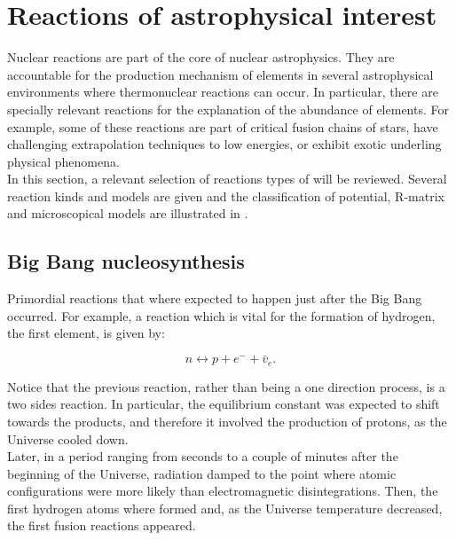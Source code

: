 \documentclass[openany]{book}
\begin{document}
\chapter{Reactions of astrophysical interest}  \label{ch:reactionsInterest}

Nuclear reactions are part of the core of nuclear astrophysics. They are accountable for the production mechanism of elements in several astrophysical environments where thermonuclear reactions can occur. In particular, there are specially relevant reactions for the explanation of the abundance of elements. For example, some of these reactions are part of critical fusion chains of stars, have challenging extrapolation techniques to low energies, or  exhibit exotic underling physical phenomena.   \\

In this section, a relevant selection of reactions types of will be reviewed.  Several reaction kinds and models are given and the classification of potential, R-matrix and microscopical models are illustrated in \cite{descouvemont_2020}.



\section{Big Bang nucleosynthesis} \label{sec:BBN}

Primordial reactions that where expected to happen just after the Big Bang occurred. For example, a reaction which is vital for the formation of hydrogen, the first element, is given by: 

\begin{equation} \label{eq:reaction_BBN_np}
	n \leftrightarrow p + e^{-} + \bar v_{e}. 
\end{equation}

Notice that the previous reaction, rather than being a one direction process, is a two sides reaction. In particular, the equilibrium constant was expected to shift towards the products, and therefore it involved the production of protons, as the Universe cooled down. \\

Later, in a period ranging from seconds to a couple of minutes after the beginning of the Universe, radiation damped to the point where atomic configurations were more likely than electromagnetic disintegrations. Then, the first hydrogen atoms where formed and, as the Universe temperature decreased, the first fusion reactions appeared.  \\
\end{document}
